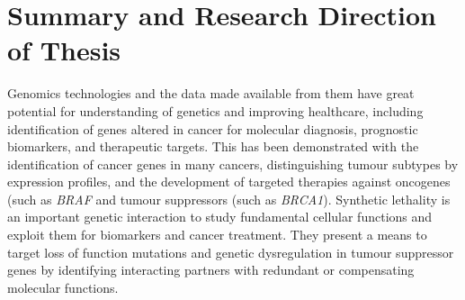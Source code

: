 





\section{Summary and Research Direction of Thesis}

Genomics technologies and the data made available from them have great potential for understanding of genetics and improving healthcare, including identification of genes altered in cancer for molecular diagnosis, prognostic biomarkers, and therapeutic targets. This has been demonstrated with the identification of cancer genes in many cancers, distinguishing tumour subtypes by expression profiles, and the development of targeted therapies against oncogenes (such as \textit{BRAF} and tumour suppressors (such as \textit{BRCA1}). Synthetic lethality is an important genetic interaction to study fundamental cellular functions and exploit them for biomarkers and cancer treatment. They present a means to target loss of function mutations and genetic dysregulation in tumour suppressor genes by identifying interacting partners with redundant or compensating molecular functions.  

